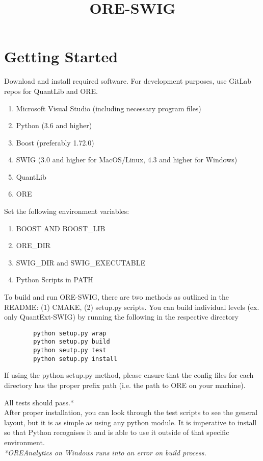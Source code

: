 \documentclass[10pt]{article}
\title{ORE-SWIG}
\date{}
\begin{document}
\maketitle
\section*{Getting Started}
    Download and install required software. For development purposes, use GitLab repos for QuantLib and ORE.
\begin{enumerate}
    \item Microsoft Visual Studio (including necessary program files)
    \item Python (3.6 and higher)
    \item Boost (preferably 1.72.0)
    \item SWIG (3.0 and higher for MacOS/Linux, 4.3 and higher for Windows)
    \item QuantLib
    \item ORE
\end{enumerate}

Set the following environment variables:
\begin{enumerate}
    \item BOOST AND BOOST\_LIB
    \item ORE\_DIR
    \item SWIG\_DIR and SWIG\_EXECUTABLE 
    \item Python Scripts in PATH
\end{enumerate}

To build and run ORE-SWIG, there are two methods as outlined in the README: (1) CMAKE, (2) setup.py scripts. You can build individual levels (ex. only QuantExt-SWIG) by running the following in the respective directory
\begin{lstlisting}
        python setup.py wrap 
        python setup.py build 
        python seutp.py test 
        python setup.py install 
\end{lstlisting}

If using the python setup.py method, please ensure that the config files for each directory has the proper prefix path (i.e. the path to ORE on your machine).

All tests should pass.* \\
After proper installation, you can look through the test scripts to see the general layout, but it is as simple as using any python module. It is imperative to install so that Python recognises it and is able to use it outside of that specific environment.\\
\textit{*OREAnalytics on Windows runs into an error on build process.}
\end{document}
